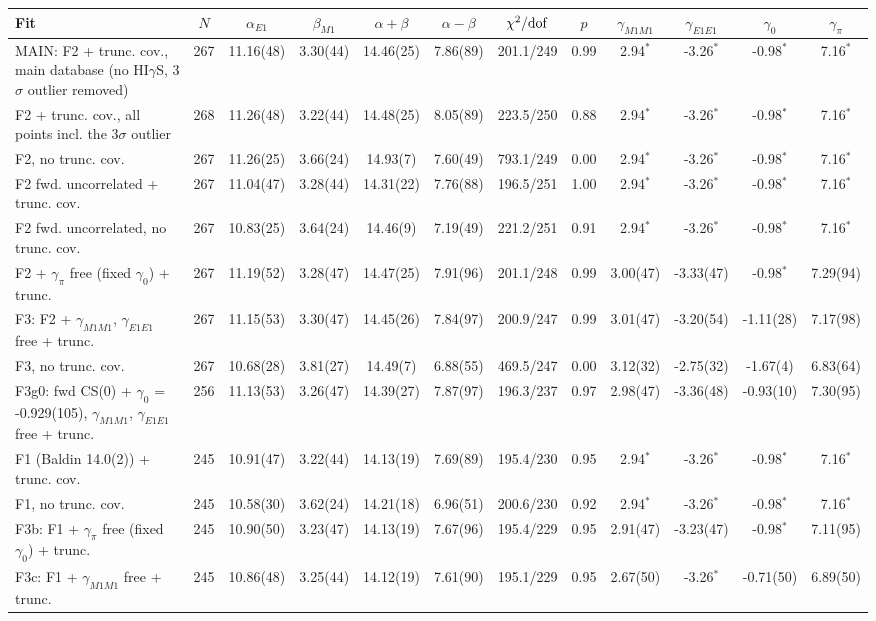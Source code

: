 
\begin{tabular}{lccccccccccc}
\hline
Fit & $N$ & $\alpha_{E1}$ & $\beta_{M1}$ & $\alpha+\beta$ & $\alpha-\beta$ & $\chi^2/{\rm dof}$ & $p$ & $\gamma_{M1M1}$ & $\gamma_{E1E1}$ & $\gamma_0$ & $\gamma_\pi$ \\
\hline
MAIN: F2 + trunc. cov., main database (no HI$\gamma$S, 3$\sigma$ outlier removed) & 267 & 11.16(48) & 3.30(44) & 14.46(25) & 7.86(89) & 201.1/249 & 0.99 & 2.94$^*$ & -3.26$^*$ & -0.98$^*$ & 7.16$^*$ \\
F2 + trunc. cov., all points incl. the 3$\sigma$ outlier & 268 & 11.26(48) & 3.22(44) & 14.48(25) & 8.05(89) & 223.5/250 & 0.88 & 2.94$^*$ & -3.26$^*$ & -0.98$^*$ & 7.16$^*$ \\
F2, no trunc. cov. & 267 & 11.26(25) & 3.66(24) & 14.93(7) & 7.60(49) & 793.1/249 & 0.00 & 2.94$^*$ & -3.26$^*$ & -0.98$^*$ & 7.16$^*$ \\
F2 fwd. uncorrelated + trunc. cov. & 267 & 11.04(47) & 3.28(44) & 14.31(22) & 7.76(88) & 196.5/251 & 1.00 & 2.94$^*$ & -3.26$^*$ & -0.98$^*$ & 7.16$^*$ \\
F2 fwd. uncorrelated, no trunc. cov. & 267 & 10.83(25) & 3.64(24) & 14.46(9) & 7.19(49) & 221.2/251 & 0.91 & 2.94$^*$ & -3.26$^*$ & -0.98$^*$ & 7.16$^*$ \\
F2 + $\gamma_\pi$ free (fixed $\gamma_0$) + trunc. & 267 & 11.19(52) & 3.28(47) & 14.47(25) & 7.91(96) & 201.1/248 & 0.99 & 3.00(47) & -3.33(47) & -0.98$^*$ & 7.29(94) \\
F3: F2 + $\gamma_{M1M1}$, $\gamma_{E1E1}$ free + trunc. & 267 & 11.15(53) & 3.30(47) & 14.45(26) & 7.84(97) & 200.9/247 & 0.99 & 3.01(47) & -3.20(54) & -1.11(28) & 7.17(98) \\
F3, no trunc. cov. & 267 & 10.68(28) & 3.81(27) & 14.49(7) & 6.88(55) & 469.5/247 & 0.00 & 3.12(32) & -2.75(32) & -1.67(4) & 6.83(64) \\
F3g0: fwd CS(0) + $\gamma_0$ = -0.929(105), $\gamma_{M1M1}$, $\gamma_{E1E1}$ free + trunc. & 256 & 11.13(53) & 3.26(47) & 14.39(27) & 7.87(97) & 196.3/237 & 0.97 & 2.98(47) & -3.36(48) & -0.93(10) & 7.30(95) \\
F1 (Baldin 14.0(2)) + trunc. cov. & 245 & 10.91(47) & 3.22(44) & 14.13(19) & 7.69(89) & 195.4/230 & 0.95 & 2.94$^*$ & -3.26$^*$ & -0.98$^*$ & 7.16$^*$ \\
F1, no trunc. cov. & 245 & 10.58(30) & 3.62(24) & 14.21(18) & 6.96(51) & 200.6/230 & 0.92 & 2.94$^*$ & -3.26$^*$ & -0.98$^*$ & 7.16$^*$ \\
F3b: F1 + $\gamma_\pi$ free (fixed $\gamma_0$) + trunc. & 245 & 10.90(50) & 3.23(47) & 14.13(19) & 7.67(96) & 195.4/229 & 0.95 & 2.91(47) & -3.23(47) & -0.98$^*$ & 7.11(95) \\
F3c: F1 + $\gamma_{M1M1}$ free + trunc. & 245 & 10.86(48) & 3.25(44) & 14.12(19) & 7.61(90) & 195.1/229 & 0.95 & 2.67(50) & -3.26$^*$ & -0.71(50) & 6.89(50) \\
\hline
\end{tabular}

